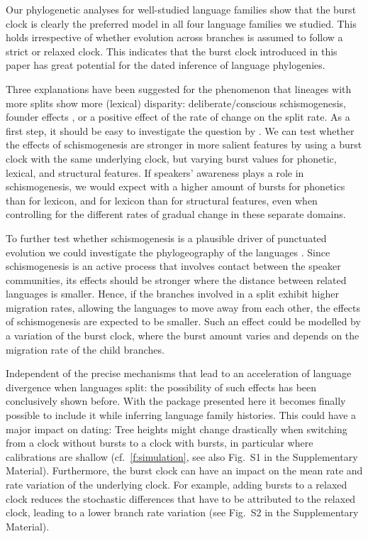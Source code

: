 \documentclass[]{rsos}%
\begin{document}
Our phylogenetic analyses for well-studied language families show that the
burst clock is clearly the preferred model in all four language families we
studied. This holds irrespective of whether evolution across branches is assumed
to follow a strict or relaxed clock.
This indicates that the burst clock introduced in this paper has great potential for
the dated inference of language phylogenies.

Three
explanations have been suggested for the phenomenon that lineages with more
splits show more (lexical) disparity: deliberate/conscious schismogenesis,
founder effects \parencite{atkinson2008languages,greenhill2017evolutionary},
or a positive effect of the rate of change on the split rate.
As a first step, it should be easy to investigate the question by
\textcite{gray2013three}. We can test whether the effects of schismogenesis are stronger in more salient features by using a burst clock with the same underlying clock, but varying burst values for phonetic, lexical, and structural features.
If speakers' awareness plays a role in schismogenesis, we would expect with
\citeauthor{gray2013three} a higher amount of bursts for phonetics than for
lexicon, and for lexicon than for structural features, even when controlling for
the different rates of gradual change in these separate domains.

To further test whether schismogenesis is a plausible driver of punctuated evolution we could investigate the phylogeography of the languages \parencite{neureiter2021can}.
Since schismogenesis is an active process that involves contact between the speaker communities, its effects should be stronger
where the distance between related languages is smaller. Hence, if the branches involved in a split exhibit higher migration rates, allowing the languages to move away from each other, the effects of schismogenesis are expected to be smaller. Such an effect could be modelled by a variation of the burst clock, where the burst amount varies and depends on the migration rate of the child branches.

Independent of the precise mechanisms that lead to an acceleration of language divergence when languages split: the possibility of such effects has been conclusively shown before. With the package presented here it becomes finally possible to include it while inferring language family histories. This could have a major impact on dating: Tree heights might change drastically when switching from a clock without bursts to a clock with bursts, in particular where calibrations are shallow (cf.\ \cref{f:simulation}, see also Fig.\ S1 in the Supplementary Material). Furthermore, the burst clock can have an impact on the mean rate and rate variation of the underlying clock.
For example, adding bursts to a relaxed clock reduces the stochastic differences that have to be attributed to the relaxed clock, leading to a lower branch rate variation (see Fig.\ S2 in the Supplementary Material).
\end{document}
